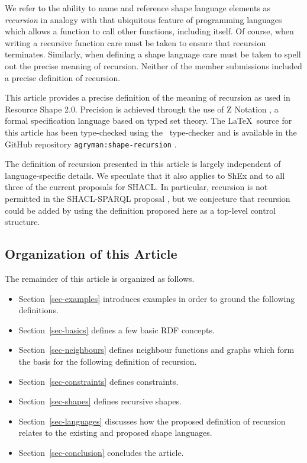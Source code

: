 \documentclass{article}
\begin{document}
We refer to the ability to name and reference shape language elements as {\em recursion} in analogy with that ubiquitous feature of programming languages which allows a function to call other functions, including itself.
Of course, when writing a recursive function care must be taken to ensure that recursion terminates.
Similarly, when defining a shape language care must be taken to spell out the precise meaning of recursion.
Neither of the member submissions included a precise definition of recursion.

This article provides a precise definition of the meaning of recursion as used in Resource Shape 2.0.
Precision is achieved through the use of Z Notation \cite{spivey:zrm}, a formal specification language based on
typed set theory.
The \LaTeX\ source for this article has been type-checked using the \fuzz\ type-checker \cite{spivey:fuzz}
and is available in the GitHub repository {\tt agryman:shape-recursion} \cite{agryman:shape-recursion}.

The definition of recursion presented in this article is largely independent of language-specific details.
We speculate that it also applies to ShEx and to all three of the current proposals for SHACL.
In particular, recursion is not permitted in the SHACL-SPARQL proposal \cite{peter:shacl}, but we conjecture
that recursion could be added by using the definition proposed here as a top-level control structure.

\subsection{Organization of this Article}
The remainder of this article is organized as follows.
\begin{itemize}
\item Section~\ref{sec-examples} introduces examples in order to ground the following definitions.
\item Section~\ref{sec-basics} defines a few basic RDF concepts.
\item Section~\ref{sec-neighbours} defines neighbour functions and graphs which form the basis for the following definition of recursion.
\item Section~\ref{sec-constraints} defines constraints.
\item Section~\ref{sec-shapes} defines recursive shapes.
\item Section~\ref{sec-languages} discusses how the proposed definition of recursion relates to the existing and proposed shape languages.
\item Section~\ref{sec-conclusion} concludes the article.
\end{itemize}
\end{document}
